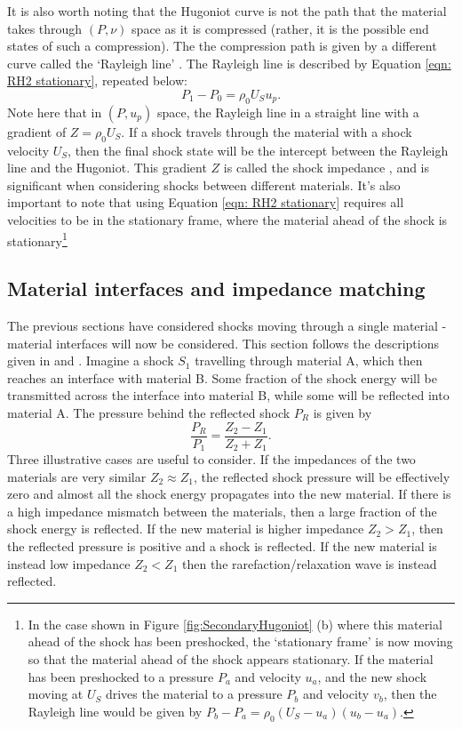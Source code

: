 It is also worth noting that the Hugoniot curve is not the path that the material takes through $(P, \nu)$ space as it is compressed (rather, it is the possible end states of such a compression). The the compression path is given by a different curve called the `Rayleigh line' \cite{Forbes2012}. The Rayleigh line is described by Equation \ref{eqn: RH2 stationary}, repeated below:
\begin{equation} P_1 - P_0 = \rho_0 U_S u_p.  \end{equation}
Note here that in $(P, u_p)$ space, the Rayleigh line in a straight line with a gradient of $Z = \rho_0 U_S$. If a shock travels through the material with a shock velocity $U_S$, then the final shock state will be the intercept between the Rayleigh line and the Hugoniot. This gradient $Z$ is called the shock impedance , and is significant when considering shocks between different materials. It's also important to note that using Equation \ref{eqn: RH2 stationary} requires all velocities to be in the stationary frame, where the material ahead of the shock is stationary\footnote{In the case shown in Figure \ref{fig:SecondaryHugoniot} (b) where this material ahead of the shock has been preshocked, the `stationary frame' is now moving so that the material ahead of the shock appears stationary. If the material has been preshocked to a pressure $P_a$ and velocity $u_a$, and the new shock moving at $U_S$ drives the material to a pressure $P_b$ and velocity $v_b$, then the Rayleigh line would be given by $P_b - P_a = \rho_0 (U_S - u_a) (u_b - u_a).$ }

\subsection{Material interfaces and impedance matching \label{IMTheory}}

The previous sections have considered shocks moving through a single material - material interfaces will now be considered. This section follows the descriptions given in \cite{Forbes2012} and \cite{Davison2008}. Imagine a shock $S_1$ travelling through material A, which then reaches an interface with material B. Some fraction of the shock energy will be transmitted across the interface into material B, while some will be reflected into material A. The pressure behind the reflected shock $P_R$ is given \cite{Colvin2013} by 
\begin{equation} \frac{P_R}{P_1} = \frac{Z_2 - Z_1}{Z_2 + Z_1}.  \end{equation}
Three illustrative cases are useful to consider. If the impedances of the two materials are very similar $Z_2 \approx Z_1$, the reflected shock pressure will be effectively zero and almost all the shock energy propagates into the new material. If there is a high impedance mismatch between the materials, then a large fraction of the shock energy is reflected. If the new material is higher impedance $Z_2 > Z_1$, then the reflected pressure is positive and a shock is reflected. If the new material is instead low impedance $Z_2 < Z_1$ then the rarefaction/relaxation wave is instead reflected.

